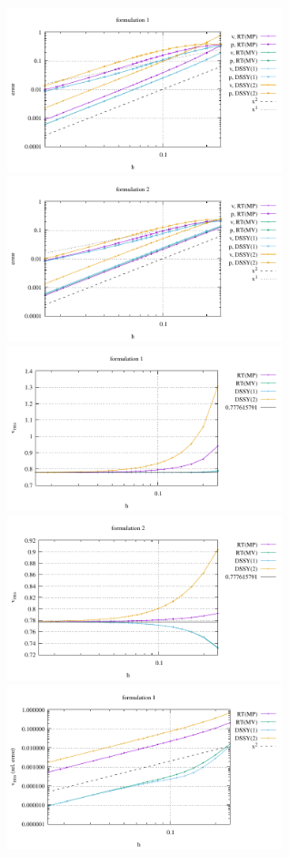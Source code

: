 \begin{itemize}
\begin{center}
\includegraphics[width=8cm]{python_codes/fieldstone_77/results/vj/errors_form1}
\includegraphics[width=8cm]{python_codes/fieldstone_77/results/vj/errors_form2}\\
\includegraphics[width=8cm]{python_codes/fieldstone_77/results/vj/vrms_form1}
\includegraphics[width=8cm]{python_codes/fieldstone_77/results/vj/vrms_form2}\\
\includegraphics[width=8cm]{python_codes/fieldstone_77/results/vj/vrms_form1_relerror}

\end{center}
\end{itemize}
